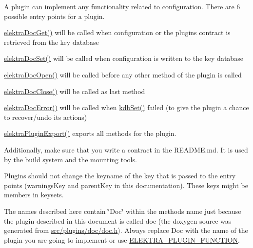 A plugin can implement any functionality related to configuration. There are 6 possible entry points for a plugin.
\begin{DoxyItemize}
\item \hyperlink{group__plugin_gacb69f3441c6d84241b4362f958fbe313}{elektra\+Doc\+Get()} will be called when configuration or the plugin\textquotesingle{}s contract is retrieved from the key database
\item \hyperlink{group__plugin_gae65781a1deb34efc79c8cb9d9174842c}{elektra\+Doc\+Set()} will be called when configuration is written to the key database
\item \hyperlink{group__plugin_ga23c2eb3584e38a4d494eb8f91e5e3d8d}{elektra\+Doc\+Open()} will be called before any other method of the plugin is called
\item \hyperlink{group__plugin_ga1236aefe5b2baf8b7bf636ba5aa9ea29}{elektra\+Doc\+Close()} will be called as last method
\item \hyperlink{group__plugin_gad74b35f558ac7c3262f6069c5c47dc79}{elektra\+Doc\+Error()} will be called when \hyperlink{group__kdb_ga11436b058408f83d303ca5e996832bcf}{kdb\+Set()} failed (to give the plugin a chance to recover/undo its actions)
\item \hyperlink{group__plugin_ga8dd092048e972a3f0c9c9f54eb41576e}{elektra\+Plugin\+Export()} exports all methods for the plugin.
\end{DoxyItemize}

Additionally, make sure that you write a contract in the R\+E\+A\+D\+M\+E.\+md. It is used by the build system and the mounting tools.

Plugins should not change the keyname of the key that is passed to the entry points (warnings\+Key and parent\+Key in this documentation). These keys might be members in keysets.

The names described here contain \char`\"{}\+Doc\char`\"{} within the method\textquotesingle{}s name just because the plugin described in this document is called doc (the doxygen source was generated from \hyperlink{doc_8h}{src/plugins/doc/doc.\+h}). Always replace Doc with the name of the plugin you are going to implement or use \hyperlink{group__plugin_gacb05c902e4014535589db4193da87460}{E\+L\+E\+K\+T\+R\+A\+\_\+\+P\+L\+U\+G\+I\+N\+\_\+\+F\+U\+N\+C\+T\+I\+ON}.

